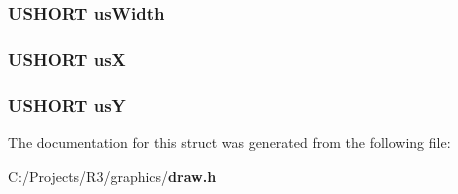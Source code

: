 \subsubsection[{usWidth}]{\setlength{\rightskip}{0pt plus 5cm}USHORT {\bf usWidth}}\label{struct_d_r_a_w___s_t_a_m_p___s_t_r_u_c_t_a8ed0f2aa3e23377fc6b0b73a4f5e68c7}
\subsubsection[{usX}]{\setlength{\rightskip}{0pt plus 5cm}USHORT {\bf usX}}\label{struct_d_r_a_w___s_t_a_m_p___s_t_r_u_c_t_a6ead387c0c38c4f3f98aac147733a602}
\subsubsection[{usY}]{\setlength{\rightskip}{0pt plus 5cm}USHORT {\bf usY}}\label{struct_d_r_a_w___s_t_a_m_p___s_t_r_u_c_t_aeb96aa8e26a2ce680ec0e55e40f33a44}


The documentation for this struct was generated from the following file:\begin{DoxyCompactItemize}
\item 
C:/Projects/R3/graphics/{\bf draw.h}\end{DoxyCompactItemize}
